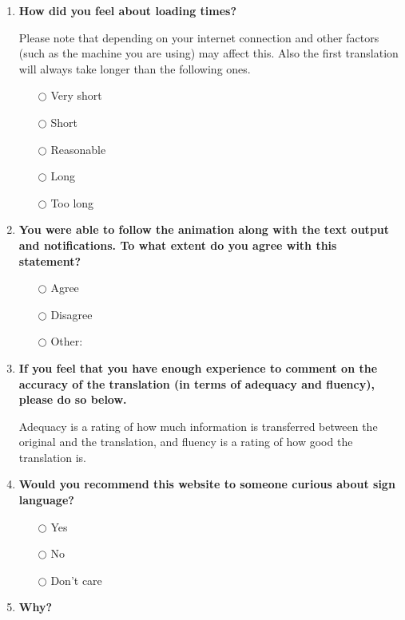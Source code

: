 \documentclass[12pt]{ociamthesis}  %
\begin{document}
{\begin{enumerate}[resume]
	\item \textbf{How did you feel about loading times?}
	\par{\fontsize{10}{12}\selectfont Please note that depending on your internet connection and other factors (such as the machine you are using) may affect this. Also the first translation will always take longer than the following ones.}
	\begin{enumerate}
		\item[$\bigcirc$] Very short
		\item[$\bigcirc$] Short
		\item[$\bigcirc$] Reasonable
		\item[$\bigcirc$] Long
		\item[$\bigcirc$] Too long
	\end{enumerate}		
	
	\item \textbf{You were able to follow the animation along with the text output and notifications. To what extent do you agree with this statement?}
	\begin{enumerate}
		\item[$\bigcirc$] Agree
		\item[$\bigcirc$] Disagree
		\item[$\bigcirc$] Other: \dotfill
	\end{enumerate}

	\item \textbf{If you feel that you have enough experience to comment on the accuracy of the translation (in terms of adequacy and fluency), please do so below.}
	\par{\fontsize{10}{12}\selectfont Adequacy is a rating of how much information is transferred between the original and the translation, and fluency is a rating of how good the translation is.}
	\par \dotfill
	
	\item \textbf{Would you recommend this website to someone curious about sign language?}
	\begin{enumerate}
		\item[$\bigcirc$] Yes
		\item[$\bigcirc$] No
		\item[$\bigcirc$] Don't care
	\end{enumerate}

	\item \textbf{Why?}
	\par \dotfill
	

\end{enumerate}}
\end{document}
